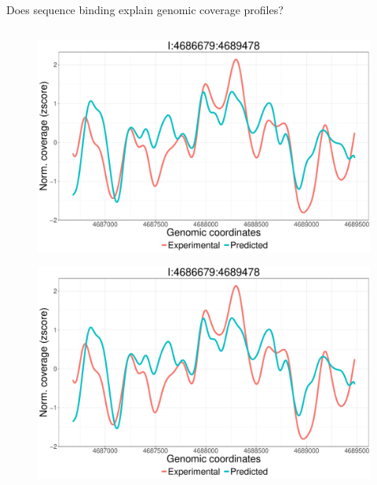 \documentclass[10pt]{beamer}
\begin{document}
\begin{frame}{Does sequence binding explain genomic coverage profiles?}
{\begin{columns}
\begin{column}{0.5\linewidth}
\begin{figure}
        \includegraphics[scale=0.17]{highspear_celenoBS_smp3.pdf}
      \end{figure}
      \begin{figure}
        \vspace{-0.7cm}
        \includegraphics[scale=0.17]{highspear_celenoBS_smp3.pdf}
      \end{figure}
    \end{column}
  \end{columns}
  }
\end{frame}
\end{document}
